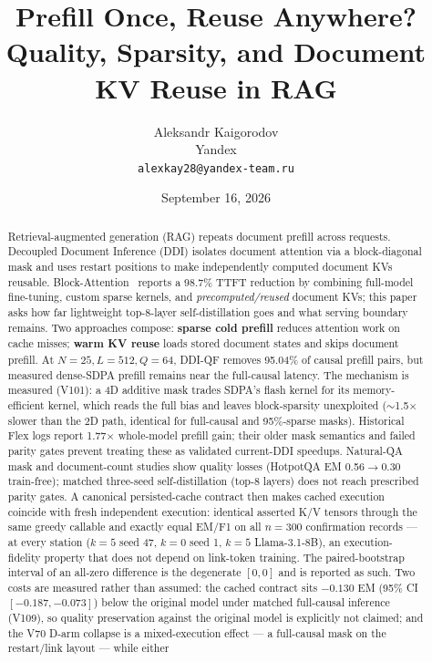 \documentclass[10pt]{article}
\title{Prefill Once, Reuse Anywhere?\\
       Quality, Sparsity, and Document KV Reuse in RAG}
\author{Aleksandr Kaigorodov\\
        Yandex\\
        \texttt{alexkay28@yandex-team.ru}}
\date{September 16, 2026}
\begin{document}
\maketitle

\begin{abstract}
Retrieval-augmented generation (RAG) repeats document prefill across requests.
Decoupled Document Inference (DDI) isolates document attention via a
block-diagonal mask and uses restart positions to make independently computed
document KVs reusable. Block-Attention~\citep{ma2025blockattention} reports a
98.7\% TTFT reduction by combining full-model fine-tuning, custom sparse
kernels, and \emph{precomputed/reused} document KVs; this paper asks how far
lightweight top-8-layer self-distillation goes and what serving boundary
remains. Two approaches compose: \textbf{sparse cold prefill} reduces
attention work on cache misses; \textbf{warm KV reuse} loads stored document
states and skips document prefill. At $N=25,L=512,Q=64$, DDI-QF removes
95.04\% of causal prefill pairs, but measured dense-SDPA prefill remains near the
full-causal latency. The mechanism is measured (V101): a 4D additive mask
trades SDPA's flash kernel for its memory-efficient kernel, which reads the
full bias and leaves block-sparsity unexploited ($\sim$1.5$\times$ slower
than the 2D path, identical for full-causal and 95\%-sparse masks).
Historical Flex logs report 1.77$\times$ whole-model prefill gain; their older
mask semantics and failed parity gates prevent treating these as validated
current-DDI speedups. Natural-QA mask and document-count studies show quality
losses (HotpotQA EM 0.56$\to$0.30 train-free); matched three-seed
self-distillation (top-8 layers) does not reach prescribed parity gates. A
canonical persisted-cache contract then makes cached execution coincide with
fresh independent execution: identical asserted K/V tensors through the same
greedy callable and exactly equal EM/F1 on all $n{=}300$ confirmation records
--- at every station ($k{=}5$ seed 47, $k{=}0$ seed 1, $k{=}5$
Llama-3.1-8B), an execution-fidelity property that does not depend on
link-token training. The paired-bootstrap interval of an all-zero difference
is the degenerate $[0,0]$ and is reported as such. Two costs are measured
rather than assumed: the cached contract sits $-0.130$ EM (95\% CI
$[-0.187,-0.073]$) below the original model under matched full-causal
inference (V109), so quality preservation against the original model is
explicitly not claimed; and the V70 D-arm collapse is a mixed-execution
effect --- a full-causal mask on the restart/link layout --- while either

\end{abstract}
\end{document}
